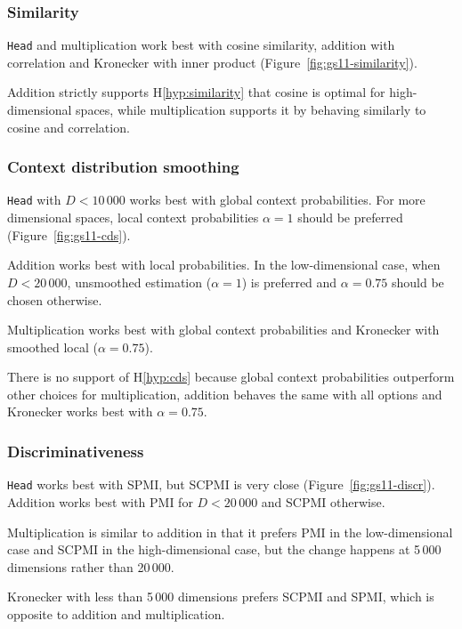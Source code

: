 \subsubsection{Similarity}



\texttt{Head} and multiplication work best with cosine similarity, addition with correlation and Kronecker with inner product (Figure~\ref{fig:gs11-similarity}).

Addition strictly supports H\ref{hyp:similarity} that cosine is optimal for high-dimensional spaces, while multiplication supports it by behaving similarly to cosine and correlation.

\subsubsection{Context distribution smoothing}

\texttt{Head} with $D < 10\,000$ works best with global context probabilities. For more dimensional spaces, local context probabilities $\alpha = 1$ should be preferred (Figure~\ref{fig:gs11-cds}).

Addition works best with local probabilities. In the low-dimensional case, when $D < 20\,000$, unsmoothed estimation ($\alpha = 1$) is preferred and $\alpha = 0.75$ should be chosen otherwise.

Multiplication works best with global context probabilities and Kronecker with smoothed local ($\alpha = 0.75$).

There is no support of H\ref{hyp:cds} because global context probabilities outperform other choices for multiplication, addition behaves the same with all options and Kronecker works best with $\alpha = 0.75$.

\subsubsection{Discriminativeness}



\texttt{Head} works best with SPMI, but SCPMI is very close (Figure~\ref{fig:gs11-discr}). Addition works best with PMI for $D < 20\,000$ and SCPMI otherwise.

Multiplication is similar to addition in that it prefers PMI in the low-dimensional case and SCPMI in the high-dimensional case, but the change happens at 5\,000 dimensions rather than 20\,000.

Kronecker with less than 5\,000 dimensions prefers SCPMI and SPMI, which is opposite to addition and multiplication.

